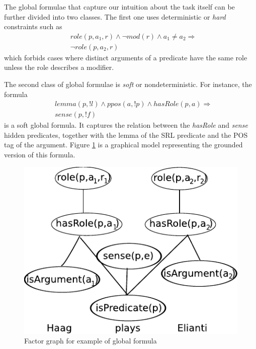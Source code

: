 
The global formulae that capture our intuition about the task itself can be further divided into two classes. The first one uses deterministic or \emph{hard} constraints such as
\begin{eqnarray*}
 &role\left(p,a_{1},r\right)\wedge \neg mod\left(r\right)\wedge a_{1}\neq a_{2}  \Rightarrow\\
  & \neg role\left(p,a_{2},r\right)
\end{eqnarray*}
which forbids cases where distinct arguments of a predicate have the same role unless the role describes a modifier.

The second class of global formulae is \emph{soft} or nondeterministic. For instance, the formula  
\begin{eqnarray*}
  & lemma(p,!l) \wedge ppos(a,!p) \wedge hasRole(p,a)  \Rightarrow \\
  & sense(p,!f) 
\end{eqnarray*}
is a soft global formula. It captures the relation between the \emph{hasRole} and \emph{sense} hidden predicates, together with the lemma of the SRL predicate and the POS tag of the argument. Figure \ref{fig:global2} is a graphical model representing the grounded version of this formula. %

\begin{figure}
\begin{center}
   \includegraphics[scale=.70]{GlobalFormula2}
\end{center}
\caption{Factor graph for example of global formula}
\label{fig:global2}
\end{figure}






